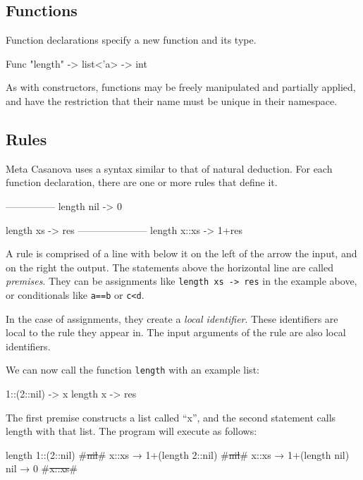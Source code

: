 \subsection{Functions}
Function declarations specify a new function and its type.

\begin{MC}
Func "length" -> list<'a> -> int
\end{MC}

As with constructors, functions may be freely manipulated and partially applied, and have the restriction that their name must be unique in their namespace.

\subsection{Rules}
Meta Casanova uses a syntax similar to that of natural deduction.
For each function declaration, there are one or more rules that define it.

\begin{MC}
---------------
length nil -> 0

length xs -> res
---------------------
length x::xs -> 1+res
\end{MC}

A rule is comprised of a line with below it on the left of the arrow the input, and on the right the output.
The statements above the horizontal line are called \textit{premises}\label{premises}.
They can be assignments like \verb|length xs -> res| in the example above, or conditionals like \verb|a==b| or \verb|c<d|.

In the case of assignments, they create a \textit{local identifier}.
These identifiers are local to the rule they appear in.
The input arguments of the rule are also local identifiers.

We can now call the function \verb|length| with an example list:

\begin{MC}
  1::(2::nil) -> x
  length x    -> res
\end{MC}

The first premise constructs a list called ``x'', and the second statement calls length with that list.
The program will execute as follows:

\begin{MC}[escapeinside=\#\#]
length 1::(2::nil)
    #\st{nil}#
    x::xs → 1+(length 2::nil)
        #\st{nil}#
        x::xs → 1+(length nil)
            nil → 0
            #\st{x::xs}#
\end{MC}

